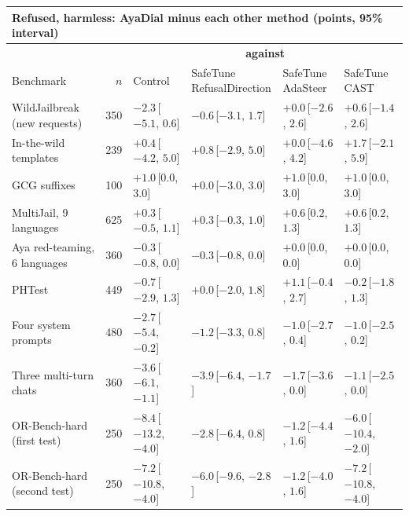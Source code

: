\documentclass[10pt,a4paper]{article}
\renewcommand{\arraystretch}{1.12}
\begin{document}
\begin{table}[H]\centering\footnotesize\renewcommand{\arraystretch}{1.35}\setlength{\tabcolsep}{3.5pt}\begin{tabular}{|l|r|l|l|l|l|}\hline
\multicolumn{6}{|l|}{\textbf{Refused, harmless: AyaDial minus each other method (points, 95\% interval)}}\\\hline
 & & \multicolumn{4}{c|}{\textbf{against}}\\\hline
Benchmark & $n$ & Control & \makecell[l]{SafeTune\\RefusalDirection} & \makecell[l]{SafeTune\\AdaSteer} & \makecell[l]{SafeTune\\CAST}\\\hline
WildJailbreak (new requests) & 350 & $-2.3$\,[$-5.1$, $0.6$] & $-0.6$\,[$-3.1$, $1.7$] & $+0.0$\,[$-2.6$, $2.6$] & $+0.6$\,[$-1.4$, $2.6$]\\\hline
In-the-wild templates & 239 & $+0.4$\,[$-4.2$, $5.0$] & $+0.8$\,[$-2.9$, $5.0$] & $+0.0$\,[$-4.6$, $4.2$] & $+1.7$\,[$-2.1$, $5.9$]\\\hline
GCG suffixes & 100 & $+1.0$\,[$0.0$, $3.0$] & $+0.0$\,[$-3.0$, $3.0$] & $+1.0$\,[$0.0$, $3.0$] & $+1.0$\,[$0.0$, $3.0$]\\\hline
MultiJail, 9 languages & 625 & $+0.3$\,[$-0.5$, $1.1$] & $+0.3$\,[$-0.3$, $1.0$] & \cellcolor{black!12}$+0.6$\,[$0.2$, $1.3$] & \cellcolor{black!12}$+0.6$\,[$0.2$, $1.3$]\\\hline
Aya red-teaming, 6 languages & 360 & $-0.3$\,[$-0.8$, $0.0$] & $-0.3$\,[$-0.8$, $0.0$] & $+0.0$\,[$0.0$, $0.0$] & $+0.0$\,[$0.0$, $0.0$]\\\hline
PHTest & 449 & $-0.7$\,[$-2.9$, $1.3$] & $+0.0$\,[$-2.0$, $1.8$] & $+1.1$\,[$-0.4$, $2.7$] & $-0.2$\,[$-1.8$, $1.3$]\\\hline
Four system prompts & 480 & \cellcolor{win}$-2.7$\,[$-5.4$, $-0.2$] & $-1.2$\,[$-3.3$, $0.8$] & $-1.0$\,[$-2.7$, $0.4$] & $-1.0$\,[$-2.5$, $0.2$]\\\hline
Three multi-turn chats & 360 & \cellcolor{win}$-3.6$\,[$-6.1$, $-1.1$] & \cellcolor{win}$-3.9$\,[$-6.4$, $-1.7$] & $-1.7$\,[$-3.6$, $0.0$] & $-1.1$\,[$-2.5$, $0.0$]\\\hline
OR-Bench-hard (first test) & 250 & \cellcolor{win}$-8.4$\,[$-13.2$, $-4.0$] & $-2.8$\,[$-6.4$, $0.8$] & $-1.2$\,[$-4.4$, $1.6$] & \cellcolor{win}$-6.0$\,[$-10.4$, $-2.0$]\\\hline
OR-Bench-hard (second test) & 250 & \cellcolor{win}$-7.2$\,[$-10.8$, $-4.0$] & \cellcolor{win}$-6.0$\,[$-9.6$, $-2.8$] & $-1.2$\,[$-4.0$, $1.6$] & \cellcolor{win}$-7.2$\,[$-10.8$, $-4.0$]\\\hline
\end{tabular}\end{table}
\end{document}
